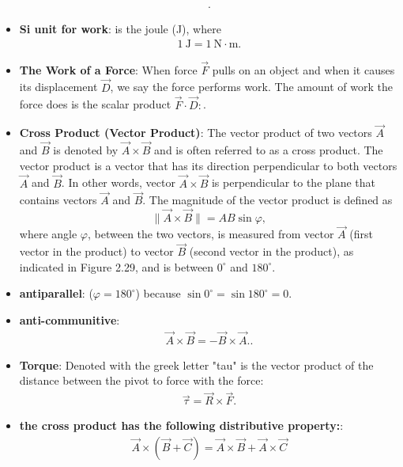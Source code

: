 \documentclass{report}
\begin{document}
\begin{itemize}
\begin{align*}
        .\end{align*}
    \item \textbf{Si unit for work}: is the joule (J), where 
        \begin{align*}
            1\ \text{J} = 1\ \text{N} \cdot \text{m} 
        .\end{align*}
    \item \textbf{The Work of a Force}: When force $\vec{F}$ pulls on an object and when it causes its displacement $\vec{D}$, we say the force performs work. The amount of work the force does is the scalar product $\vec{F} \cdot \vec{D}:$.
    \item \textbf{Cross Product (Vector Product)}: 
        The vector product of two vectors $\vec{A}$ and $\vec{B}$ is denoted by $\vec{A} \times \vec{B}$ and is often referred to as a cross product. The vector product is a vector that has its direction perpendicular to both vectors $\vec{A}$ and $\vec{B}$. In other words, vector $\vec{A} \times \vec{B}$ is perpendicular to the plane that contains vectors $\vec{A}$ and $\vec{B}$. The magnitude of the vector product is defined as
        \begin{equation}
            \lVert \vec{A} \times \vec{B} \rVert = AB \sin \varphi,
        \end{equation}
        where angle $\varphi$, between the two vectors, is measured from vector $\vec{A}$ (first vector in the product) to vector $\vec{B}$ (second vector in the product), as indicated in Figure 2.29, and is between $0^\circ$ and $180^\circ$.
    \item \textbf{antiparallel}: ($\varphi=180^\circ$) because $\sin 0^\circ = \sin 180^\circ = 0$.
    \item \textbf{anti-communitive}:
        \begin{align*}
            \vec{A} \times \vec{B} = -\vec{B} \times \vec{A}.
        .\end{align*}
    \item \textbf{Torque}: Denoted with the greek letter "tau" is the vector product of the distance between the pivot to force with the force:
        \begin{align*}
            \vec{\tau} = \vec{R} \times \vec{F}
        .\end{align*}
    \item \textbf{the cross product has the following distributive property:}:
        \begin{align*}
            \vec{A} \times (\vec{B} + \vec{C}) = \vec{A} \times \vec{B} + \vec{A} \times \vec{C}

\end{align*}
\end{itemize}
\end{document}
